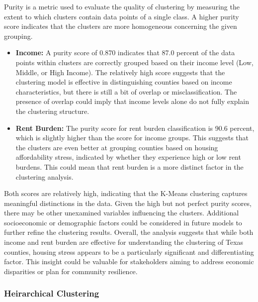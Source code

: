 \documentclass[
]{article}
\providecommand{\tightlist}{%
  \setlength{\itemsep}{0pt}\setlength{\parskip}{0pt}}
\begin{document}
Purity is a metric used to evaluate the quality of clustering by
measuring the extent to which clusters contain data points of a single
class. A higher purity score indicates that the clusters are more
homogeneous concerning the given grouping.

\vspace{5pt}

\begin{itemize}
\tightlist
\item
  \textbf{Income:} A purity score of 0.870 indicates that 87.0 percent
  of the data points within clusters are correctly grouped based on
  their income level (Low, Middle, or High Income). The relatively high
  score suggests that the clustering model is effective in
  distinguishing counties based on income characteristics, but there is
  still a bit of overlap or misclassification. The presence of overlap
  could imply that income levels alone do not fully explain the
  clustering structure.
\item
  \textbf{Rent Burden:} The purity score for rent burden classification
  is 90.6 percent, which is slightly higher than the score for income
  groups. This suggests that the clusters are even better at grouping
  counties based on housing affordability stress, indicated by whether
  they experience high or low rent burdens. This could mean that rent
  burden is a more distinct factor in the clustering analysis.
\end{itemize}

\vspace{5pt}

Both scores are relatively high, indicating that the K-Means clustering
captures meaningful distinctions in the data. Given the high but not
perfect purity scores, there may be other unexamined variables
influencing the clusters. Additional socioeconomic or demographic
factors could be considered in future models to further refine the
clustering results. Overall, the analysis suggests that while both
income and rent burden are effective for understanding the clustering of
Texas counties, housing stress appears to be a particularly significant
and differentiating factor. This insight could be valuable for
stakeholders aiming to address economic disparities or plan for
community resilience.

\subsubsection{Heirarchical Clustering}\label{heirarchical-clustering}
\end{document}
